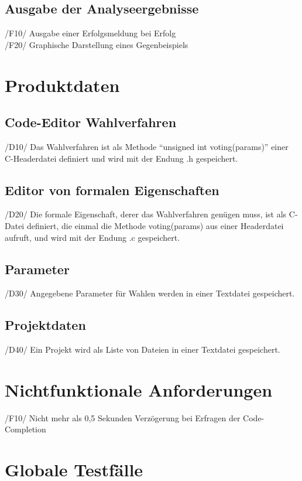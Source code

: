 \documentclass[a4paper]{scrreprt}
\begin{document}
\section{Ausgabe der Analyseergebnisse}
/F10/ Ausgabe einer Erfolgsmeldung bei Erfolg \\
/F20/ Graphische Darstellung eines Gegenbeispiels \\

\chapter{Produktdaten}
\section{Code-Editor Wahlverfahren}
/D10/ Das Wahlverfahren ist als Methode "`unsigned int voting(params)"' einer C-Headerdatei definiert und wird mit der Endung .h gespeichert.

\section{Editor von formalen Eigenschaften}
/D20/ Die formale Eigenschaft, derer das Wahlverfahren genügen muss, ist als C-Datei definiert, die einmal die Methode voting(params) aus einer Headerdatei aufruft, und wird mit der Endung .c gespeichert.

\section{Parameter}
/D30/ Angegebene Parameter für Wahlen werden in einer Textdatei gespeichert.

\section{Projektdaten}
/D40/ Ein Projekt wird als Liste von Dateien in einer Textdatei gespeichert.


\chapter{Nichtfunktionale Anforderungen}
/F10/ Nicht mehr als 0,5 Sekunden Verzögerung bei Erfragen der Code-Completion


\chapter{Globale Testfälle}
\end{document}
